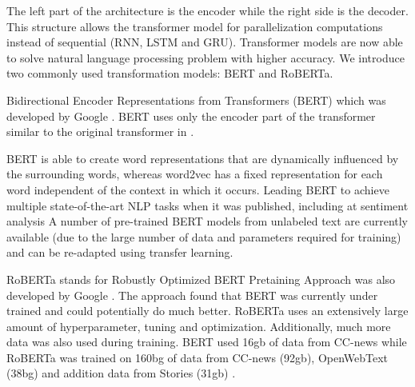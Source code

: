 The left part of the architecture is the encoder while the right side is the decoder. This structure allows the transformer model for parallelization computations instead of sequential (RNN, LSTM and GRU). Transformer models are now able to solve natural language processing problem with higher accuracy.  We introduce two commonly used transformation models: BERT and RoBERTa. 

Bidirectional Encoder Representations from Transformers (BERT) which was developed by Google \cite{Jacob2018}. BERT uses only the encoder part of the transformer similar to the original transformer in \cite{Vaswani2017}. 

BERT is able to create word representations that are dynamically influenced by the surrounding words, whereas word2vec has a fixed representation for each word independent of the context in which it occurs. Leading BERT to achieve multiple state-of-the-art NLP tasks when it was published, including at sentiment analysis \cite{Chiorrini2021} A number of pre-trained BERT models from unlabeled text are currently available (due to the large number of data and parameters required for training) and can be re-adapted using transfer learning. 

RoBERTa stands for Robustly Optimized BERT Pretaining Approach was also developed by Google \cite{Yinhan2019}. The approach found that BERT was currently under trained and could potentially do much better. RoBERTa uses an extensively large amount of hyperparameter, tuning and optimization. Additionally, much more data was also used during training. BERT used 16gb of data from CC-news while RoBERTa was trained on 160bg of data from CC-news (92gb), OpenWebText (38bg) and addition data from Stories (31gb) \cite{Yinhan2019}.
